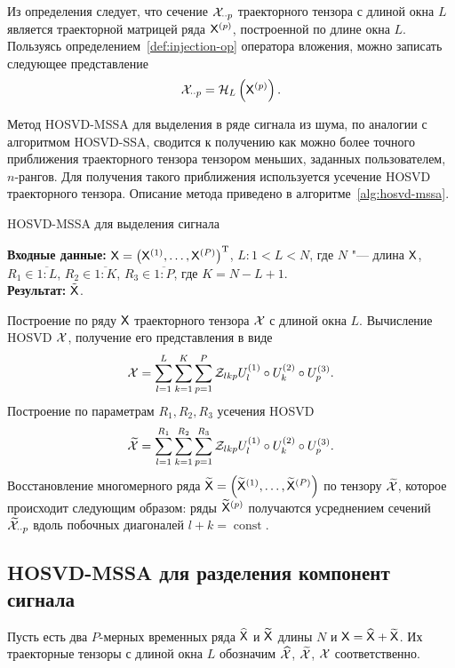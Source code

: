 \documentclass[specialist,
  substylefile=spbu.rtx,
subf,href,colorlinks=true, 12pt]{disser}
\theoremstyle{plain}
\theoremstyle{definition}
\theoremstyle{remark}
\newcommand{\Input}{\textbf{Входные данные: }}
\newcommand{\Output}{\textbf{Результат: }}
\begin{document}
Из определения следует, что сечение $\mathcal{X}_{\cdot \cdot p}$ траекторного тензора с длиной окна $L$
является траекторной матрицей ряда $\mathsf{X}^{(p)}$, построенной по длине окна $L$.
Пользуясь определением~\ref{def:injection-op} оператора вложения, можно записать следующее представление
\[
  \mathcal{X}_{\cdot \cdot p} = \mathcal{H}_L \left(\mathsf{X}^{(p)}\right).
\]

Метод HOSVD-MSSA для выделения в ряде сигнала из шума, по аналогии с алгоритмом HOSVD-SSA,
сводится к получению как можно более точного приближения траекторного тензора тензором меньших,
заданных пользователем, $n$-рангов.
Для получения такого приближения используется усечение HOSVD траекторного тензора.
Описание метода приведено в алгоритме~\ref{alg:hosvd-mssa}.

\begin{algorithm}[!ht]
  \caption{HOSVD-MSSA для выделения сигнала}
  \label{alg:hosvd-mssa}
  \Input $\mathsf{X} = \left(\mathsf{X}^{(1)}, \ldots, \mathsf{X}^{(P)}\right)^{\mathrm{T}}$,
  $L: 1< L < N$, где $N$ "--- длина $\mathsf{X}$, $R_1 \in \overline{1:L}$,
  $R_2 \in \overline{1:K}$, $R_3 \in \overline{1:P}$, где $K = N-L+1$.\\
  \Output $\tilde{\mathsf{X}}$.
  \begin{algorithmic}[1]
    \State Построение по ряду $\mathsf{X}$ траекторного тензора $\mathcal{X}$ с длиной окна $L$.
    \State Вычисление HOSVD $\mathcal{X}$, получение его представления в виде
    \begin{equation}
      \mathcal{X} = \sum_{l=1}^{L} \sum_{k=1}^{K} \sum_{p=1}^{P} \mathcal{Z}_{lkp} U_l^{(1)}\circ U_k^{(2)} \circ U_p^{(3)}.
      \label{eq:hosvd-mssa}
    \end{equation}
    \State Построение по параметрам $R_1, R_2, R_3$ усечения HOSVD
    \[
      \widetilde{\mathcal{X}}=\sum_{l=1}^{R_1} \sum_{k=1}^{R_2} \sum_{p=1}^{R_3} \mathcal{Z}_{lkp} U_l^{(1)}\circ U_k^{(2)} \circ U_p^{(3)}.
    \]
    \State \label{step:hosvd-mssa-sep-restoration} Восстановление многомерного ряда $\widetilde{\mathsf{X}}=\left(\widetilde{\mathsf{X}}^{(1)}, \ldots, \widetilde{\mathsf{X}}^{(P)}\right)$ по тензору
    $\widetilde{\mathcal{X}}$, которое происходит следующим образом:
    ряды $\widetilde{\mathsf{X}}^{(p)}$ получаются усреднением сечений $\widetilde{\mathcal{X}}_{\cdot \cdot p}$ вдоль
    побочных диагоналей $l+k=\operatorname{const}$.
  \end{algorithmic}
\end{algorithm}



\subsection{HOSVD-MSSA для разделения компонент сигнала}\label{subsec:Tensor-MSSA-sep-method-description}
Пусть есть два $P$-мерных временных ряда $\widehat{\mathsf{X}}$ и $\widetilde{\mathsf{X}}$ длины $N$ и
$\mathsf{X} = \widehat{\mathsf{X}} + \widetilde{\mathsf{X}}$. Их траекторные тензоры с длиной окна $L$ обозначим
$\widehat{\mathcal{X}}$, $\widetilde{\mathcal{X}}$, $\mathcal{X}$ соответственно.
\end{document}
